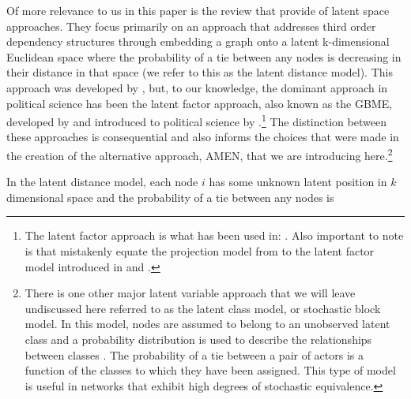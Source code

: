 Of more relevance to us in this paper is the review that \citet{cranmer:etal:2016} provide of latent space approaches. They focus primarily on an approach that addresses third order dependency structures through embedding a graph onto a latent k-dimensional Euclidean space where the probability of a tie between any nodes is decreasing in their distance in that space (we refer to this as the latent distance model). This approach was developed by \citet{hoff:etal:2002}, but, to our knowledge, the dominant approach in political science has been the latent factor approach, also known as the GBME, developed by \citet{hoff:2005} and introduced to political science by \citet{hoff:ward:2004}.\footnote{The latent factor approach is what has been used in: \citet{ward:etal:2007,cao:ward:2014,metternich:etal:2015}. Also important to note is that \citet{cranmer:etal:2016} mistakenly equate the projection model from \citet{hoff:etal:2002} to the latent factor model introduced in \citet{hoff:ward:2004} and \citet{hoff:2005}.} The distinction between these approaches is consequential and also informs the choices that were made in the creation of the alternative approach, AMEN, that we are introducing here.\footnote{There is one other major latent variable approach that we will leave undiscussed here referred to as the latent class model, or stochastic block model. In this model, nodes are assumed to belong to an unobserved latent class and a probability distribution is used to describe the relationships between classes \citep{nowicki:snijders:2001}. The probability of a tie between a pair of actors is a function of the classes to which they have been assigned. This type of model is useful in networks that exhibit high degrees of stochastic equivalence.} 



In the latent distance model, each node $i$ has some unknown latent position in $k$ dimensional space and the probability of a tie between any nodes is 


